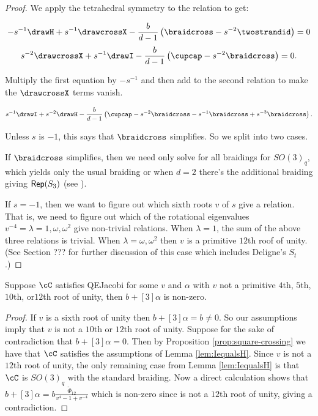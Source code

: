 \documentclass[12pt]{amsart}
\begin{document}
\begin{proof}
We apply the tetrahedral symmetry to the relation to get:

$$-s^{-1} \drawH + s^{-1} \drawcrossX -\frac{b}{d-1} \left(\braidcross - s^{-2} \twostrandid \right) = 0$$
$$s^{-2} \drawcrossX + s^{-1} \drawI -\frac{b}{d-1} \left(\cupcap -s^{-2} \braidcross \right) = 0.$$

Multiply the first equation by $-s^{-1}$ and then add to the second relation to make the $\drawcrossX$ terms vanish.

$$s^{-1} \drawI + s^{-2} \drawH - \frac{b}{d-1} \left(\cupcap -s^{-2} \braidcross -s^{-1}\braidcross + s^{-3}\braidcross  \right).$$

Unless $s$ is $-1$, this says that $\braidcross$ simplifies.  So we split into two cases.

If $\braidcross$ simplifies, then we need only solve for all braidings for $SO(3)_q$, which yields only the usual braiding or when $d=2$ there's the additional braiding giving $\operatorname{\mathsf{Rep}}(S_3)$ (see \cite{???}).

If $s = -1$, then we want to figure out which sixth roots $v$ of $s$ give a relation.  That is, we need to figure out which of the rotational eigenvalues $v^{-4} = \lambda = 1, \omega, \omega^2$ give non-trivial relations.  When $\lambda = 1$, the sum of the above three relations is trivial.  When $\lambda = \omega, \omega^2$ then $v$ is a primitive $12$th roof of unity.  (See Section ??? for further discussion of this case which includes Deligne's $S_t$.)
\end{proof}

\begin{lemma} \label{lem:bplus3alpha}
Suppose $\cC$ satisfies QEJacobi for some $v$ and $\alpha$ with $v$ not a primitive $4$th, $5$th, $10$th, or$12$th root of unity, then $b+[3]\alpha$ is non-zero.
\end{lemma}
\begin{proof}
If $v$ is a sixth root of unity then $b+[3]\alpha = b \neq 0$.  So our assumptions imply that $v$ is not a $10$th or $12$th root of unity.  Suppose for the sake of contradiction that $b+[3]\alpha = 0$.  Then by Proposition \ref{prop:square-crossing} we have that $\cC$ satisfies the assumptions of Lemma \ref{lem:IequalsH}.  Since $v$ is not a $12$th root of unity, the only remaining case from Lemma \ref{lem:IequalsH} is that $\cC$ is $SO(3)_q$ with the standard braiding.  Now a direct calculation shows that $b+[3] \alpha = b \frac{\widetilde{\Phi}_{12}}{v^4-1+v^{-4}}$ which is non-zero since is not a $12$th root of unity, giving a contradiction.
\end{proof}
\end{document}
